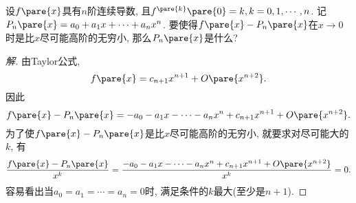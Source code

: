 \documentclass{ctexart}
\begin{document}
\begin{ex}
    设$f\pare{x}$具有$n$阶连续导数, 且$f^{\pare{k}}\pare{0} = k, k=0,1,\cdots,n$. 记$P_n\pare{x} = a_0 + a_1x + \cdots + a_nx^n$. 要使得$f\pare{x} - P_n\pare{x}$在$x\rightarrow 0$时是比$x$尽可能高阶的无穷小, 那么$P_n\pare{x}$是什么?
\end{ex}
\begin{proof}[解]
    由Taylor公式,
    \[ f\pare{x} = c_{n+1}x^{n+1} + O\pare{x^{n+2}}. \]
    因此
    \[ f\pare{x} - P_n\pare{x} = -a_0 - a_1 x - \cdots - a_nx^n + c_{n+1} x^{n+1} + O\pare{x^{n+2}}. \]
    为了使$f\pare{x} - P_n\pare{x}$是比$x$尽可能高阶的无穷小, 就要求对尽可能大的$k$, 有
    \[ \frac{f\pare{x} - P_n\pare{x}}{x^k} = \frac{-a_0 - a_1 x - \cdots - a_nx^n + c_{n+1} x^{n+1} + O\pare{x^{n+2}}}{x^k} = 0. \]
    容易看出当$a_0 = a_1 = \cdots = a_n = 0$时, 满足条件的$k$最大(至少是$n+1$).
\end{proof}
\end{document}
